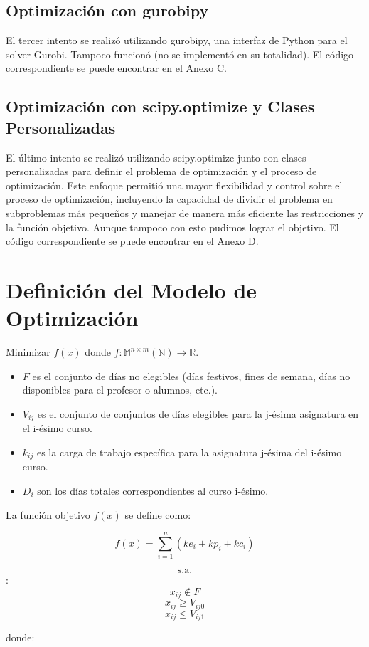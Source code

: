 \documentclass{article}
\begin{document}
\subsection{Optimización con gurobipy}
El tercer intento se realizó utilizando gurobipy, una interfaz de Python para el solver Gurobi. Tampoco funcionó (no se implement\'o en su totalidad). El código correspondiente se puede encontrar en el Anexo C.

\subsection{Optimización con scipy.optimize y Clases Personalizadas}
El último intento se realizó utilizando scipy.optimize junto con clases personalizadas para definir el problema de optimización y el proceso de optimización. Este enfoque permitió una mayor flexibilidad y control sobre el proceso de optimización, incluyendo la capacidad de dividir el problema en subproblemas más pequeños y manejar de manera más eficiente las restricciones y la función objetivo. Aunque tampoco con esto pudimos lograr el objetivo. El código correspondiente se puede encontrar en el Anexo D.
\section{Definición del Modelo de Optimización}

Minimizar $f(x)$ donde $f: \mathbb{M}^{n \times m}(\mathbb{N}) \rightarrow \mathbb{R}$.

\begin{itemize}
\item $F$ es el conjunto de días no elegibles (días festivos, fines de semana, días no disponibles para el profesor o alumnos, etc.).
\item $V_{ij}$ es el conjunto de conjuntos de días elegibles para la j-ésima asignatura en el i-ésimo curso.
\item $k_{ij}$ es la carga de trabajo específica para la asignatura j-ésima del i-ésimo curso.
\item $D_i$ son los días totales correspondientes al curso i-ésimo.
\end{itemize}

La función objetivo $f(x)$ se define como:

\[
f(x) = \sum_{i=1}^{n} (ke_i + kp_i + kc_i)
\]

$$\text{s.a.}$$:
$$x_{ij}\notin F$$
$$x_{ij} \geq V_{ij0}$$
$$x_{ij} \leq V_{ij1}$$

donde:
\end{document}
